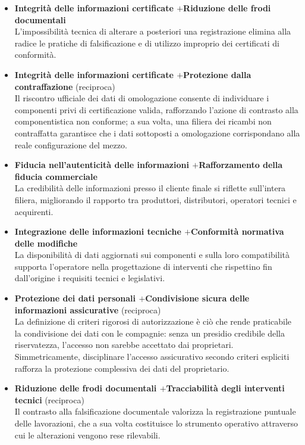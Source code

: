 \begin{itemize}
    \item \textbf{Integrit\`a delle informazioni certificate \quad$+$\quad Riduzione delle frodi documentali}\\
    L'impossibilit\`a tecnica di alterare a posteriori una registrazione elimina alla radice le pratiche di falsificazione e di utilizzo improprio dei certificati di conformit\`a.

    \item \textbf{Integrit\`a delle informazioni certificate \quad$+$\quad Protezione dalla contraffazione} (reciproca)\\
    Il riscontro ufficiale dei dati di omologazione consente di individuare i componenti privi di certificazione valida, rafforzando l'azione di contrasto alla componentistica non conforme; a sua volta, una filiera dei ricambi non contraffatta garantisce che i dati sottoposti a omologazione corrispondano alla reale configurazione del mezzo.

    \item \textbf{Fiducia nell'autenticit\`a delle informazioni \quad$+$\quad Rafforzamento della fiducia commerciale}\\
    La credibilit\`a delle informazioni presso il cliente finale si riflette sull'intera filiera, migliorando il rapporto tra produttori, distributori, operatori tecnici e acquirenti.

    \item \textbf{Integrazione delle informazioni tecniche \quad$+$\quad Conformit\`a normativa delle modifiche}\\
    La disponibilit\`a di dati aggiornati sui componenti e sulla loro compatibilit\`a supporta l'operatore nella progettazione di interventi che rispettino fin dall'origine i requisiti tecnici e legislativi.


    \item \textbf{Protezione dei dati personali \quad$+$\quad Condivisione sicura delle informazioni assicurative} (reciproca)\\
    La definizione di criteri rigorosi di autorizzazione \`e ci\`o che rende praticabile la condivisione dei dati con le compagnie: senza un presidio credibile della riservatezza, l'accesso non sarebbe accettato dai proprietari. Simmetricamente, disciplinare l'accesso assicurativo secondo criteri espliciti rafforza la protezione complessiva dei dati del proprietario.

    \item \textbf{Riduzione delle frodi documentali \quad$+$\quad Tracciabilit\`a degli interventi tecnici} (reciproca)\\
    Il contrasto alla falsificazione documentale valorizza la registrazione puntuale delle lavorazioni, che a sua volta costituisce lo strumento operativo attraverso cui le alterazioni vengono rese rilevabili.


\end{itemize}
